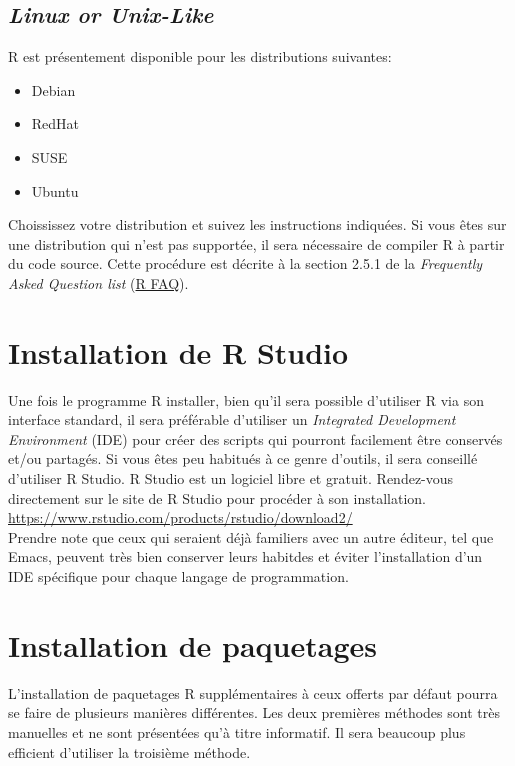 \subsection{\emph{Linux or Unix-Like}}
R est présentement disponible pour les distributions suivantes:\begin{itemize}
	\item Debian
	\item RedHat
	\item SUSE
	\item Ubuntu
\end{itemize}
Choississez votre distribution et suivez les instructions indiquées. Si vous êtes sur une distribution qui n'est pas supportée, il sera nécessaire de compiler R à partir du code source. Cette procédure est décrite à la section 2.5.1 de la \emph{Frequently Asked Question list} (\href{https://cran.r-project.org/doc/FAQ/R-FAQ.html#How-can-R-be-installed-_0028Unix_002dlike_0029}{R FAQ}).

\section{Installation de R Studio}
Une fois le programme R installer, bien qu'il sera possible d'utiliser R via son interface standard, il sera préférable d'utiliser un \emph{Integrated Development Environment} (IDE) pour créer des scripts qui pourront facilement être conservés et/ou partagés. Si vous êtes peu habitués à ce genre d'outils, il sera conseillé d'utiliser R Studio. R Studio est un logiciel libre et gratuit. Rendez-vous directement sur le site de R Studio pour procéder à son installation. \\
\url{https://www.rstudio.com/products/rstudio/download2/} \\

Prendre note que ceux qui seraient déjà familiers avec un autre éditeur, tel que Emacs, peuvent très bien conserver leurs habitdes et éviter l'installation d'un IDE spécifique pour chaque langage de programmation.

\section{Installation de paquetages}
L'installation de paquetages R supplémentaires à ceux offerts par défaut pourra se faire de plusieurs manières différentes. Les deux premières méthodes sont très manuelles et ne sont présentées qu'à titre informatif. Il sera beaucoup plus efficient d'utiliser la troisième méthode. \\

